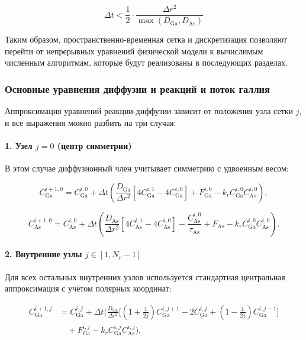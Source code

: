 \documentclass[14pt,oneside]{extarticle}
\begin{document}
\begin{equation}
\Delta t < \frac{1}{2} \cdot \frac{\Delta r^2}{\max(D_{\text{Ga}}, D_{\text{As}})}
\label{eq:cfl_final}
\end{equation}

Таким образом, пространственно-временная сетка и дискретизация позволяют перейти от непрерывных уравнений физической модели к вычислимым численным алгоритмам, которые будут реализованы в последующих разделах.

\subsubsection{Основные уравнения диффузии и реакций и поток галлия}

Аппроксимация уравнений реакции-диффузии зависит от положения узла сетки \( j \), и все выражения можно разбить на три случая:

\paragraph{1. Узел \( j = 0 \) (центр симметрии)}

В этом случае диффузионный член учитывает симметрию с удвоенным весом:

\[
C_{\text{Ga}}^{i+1,0} = C_{\text{Ga}}^{i,0}
+ \Delta t \left(
\frac{D_{\text{Ga}}}{\Delta r^2} [4 C_{\text{Ga}}^{i,1} - 4 C_{\text{Ga}}^{i,0}]
+ F_{\text{Ga}}^{i,0}
- k_r C_{\text{Ga}}^{i,0} C_{\text{As}}^{i,0}
\right),
\]

\[
C_{\text{As}}^{i+1,0} = C_{\text{As}}^{i,0}
+ \Delta t \left(
\frac{D_{\text{As}}}{\Delta r^2} [4 C_{\text{As}}^{i,1} - 4 C_{\text{As}}^{i,0}]
- \frac{C_{\text{As}}^{i,0}}{\tau_{\text{As}}}
+ F_{\text{As}} - k_r C_{\text{Ga}}^{i,0} C_{\text{As}}^{i,0}
\right).
\]

\paragraph{2. Внутренние узлы \( j \in [1, N_r-1] \)}

Для всех остальных внутренних узлов используется стандартная центральная аппроксимация с учётом полярных координат:

\begin{align*}
    C_{\text{Ga}}^{i+1,j} &= C_{\text{Ga}}^{i,j}
    + \Delta t \Bigg(
      \frac{D_{\text{Ga}}}{\Delta r^2}
      \bigg[
        \left(1 + \frac{1}{2j} \right) C_{\text{Ga}}^{i,j+1}
        - 2 C_{\text{Ga}}^{i,j}
        + \left(1 - \frac{1}{2j} \right) C_{\text{Ga}}^{i,j-1}
      \bigg] \\
    &\quad + F_{\text{Ga}}^{i,j}
    - k_r C_{\text{Ga}}^{i,j} C_{\text{As}}^{i,j}
    \Bigg),
\end{align*}
    
\end{document}
